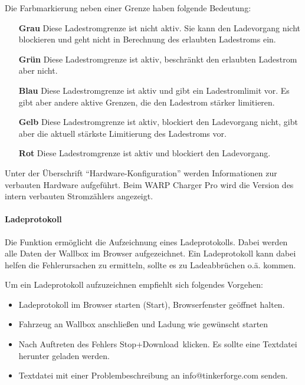 \documentclass[a4paper,10pt]{article}
\begin{document}
\begin{multicols*}{2}
	Die Farbmarkierung neben einer Grenze haben folgende Bedeutung:
	\begin{itemize}
	 \item[\textbf{\textcolor{mygray}{Grau}}] Diese Ladestromgrenze ist nicht aktiv. Sie kann den Ladevorgang nicht blockieren und geht nicht in Berechnung des erlaubten Ladestroms ein.
	 \item[\textbf{\textcolor{mygreen}{Grün}}] Diese Ladestromgrenze ist aktiv, beschränkt den erlaubten Ladestrom aber nicht.
	 \item[\textbf{\textcolor{myblue}{Blau}}] Diese Ladestromgrenze ist aktiv und gibt ein Ladestromlimit vor. Es gibt aber andere aktive Grenzen, die den Ladestrom stärker limitieren.
	 \item[\textbf{\textcolor{myorange}{Gelb}}] Diese Ladestromgrenze ist aktiv, blockiert den Ladevorgang nicht, gibt aber die aktuell stärkste Limitierung des Ladestroms vor.
	 \item[\textbf{\textcolor{myred}{Rot}}] Diese Ladestromgrenze ist aktiv und blockiert den Ladevorgang.
	\end{itemize}


	Unter der Überschrift \enquote{Hardware-Konfiguration} werden Informationen
	zur verbauten Hardware aufgeführt. Beim WARP Charger Pro wird die Version
	des intern verbauten Stromzählers angezeigt.

	\paragraph{Ladeprotokoll} 
	Die Funktion ermöglicht die Aufzeichnung eines Ladeprotokolls.
	Dabei werden alle Daten der Wallbox im Browser aufgezeichnet. Ein
	Ladeprotokoll kann dabei helfen die Fehlerursachen zu ermitteln, sollte es
	zu Ladeabbrüchen o.ä. kommen.

	Um ein Ladeprotokoll aufzuzeichnen empfiehlt sich folgendes Vorgehen:
	\begin{itemize}
		\item Ladeprotokoll im Browser starten (\glqq Start\grqq), Browserfenster geöffnet halten.
		\item Fahrzeug an Wallbox anschließen und Ladung wie gewünscht starten
		\item Nach Auftreten des Fehlers \glqq Stop+Download\grqq~klicken. Es
		sollte eine Textdatei herunter geladen werden.
		\item Textdatei mit einer Problembeschreibung an info@tinkerforge.com
		senden.
	\end{itemize}


\end{multicols*}
\end{document}
